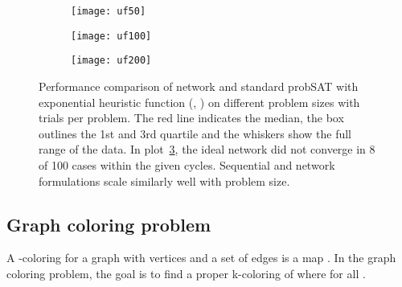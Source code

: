 \documentclass[10pt]{article}
\begin{document}
\begin{figure}
 \centering
     \begin{subfigure}[h]{0.3\textwidth}
     \texttt{[image: uf50]} 
     \label{fig:scale_50}
   \end{subfigure}
   \quad
   \begin{subfigure}[h]{0.3\textwidth}
     \texttt{[image: uf100]} 
     \label{fig:scale_100}
   \end{subfigure}
   \quad
    \begin{subfigure}[h]{0.3\textwidth}
     \texttt{[image: uf200]} 
     \label{fig:scale_200}
   \end{subfigure}
   \caption{Performance comparison of network and standard probSAT with exponential heuristic function (, ) on different problem sizes with  trials per problem.  The red line indicates the median, the box outlines the 1st and 3rd quartile and the whiskers show the full range of the data. In plot~\ref{fig:scale_200}, the ideal network did not converge in 8 of 100 cases within the given  cycles. Sequential and network formulations scale similarly well with problem size.}
\label{fig:scale}
\end{figure}	




\subsection*{Graph coloring problem}
\label{sec:colour}
A -coloring for a graph  with vertices  and a set of edges  is a map . In the graph coloring problem, the goal is to find a proper k-coloring  of  where  for all .
\end{document}
